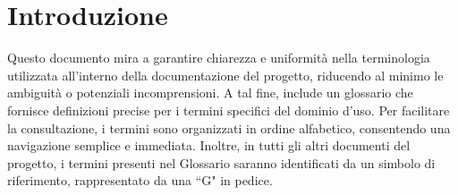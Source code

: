 \section*{Introduzione}  
Questo documento mira a garantire chiarezza e uniformità nella terminologia utilizzata all'interno della documentazione del progetto, riducendo al minimo le ambiguità o potenziali incomprensioni. A tal fine, include un glossario che fornisce definizioni precise per i termini specifici del dominio d'uso.
Per facilitare la consultazione, i termini sono organizzati in ordine alfabetico, consentendo una navigazione semplice e immediata. Inoltre, in tutti gli altri documenti del progetto, i termini presenti nel Glossario saranno identificati da un simbolo di riferimento, rappresentato da una ``G" in pedice.
